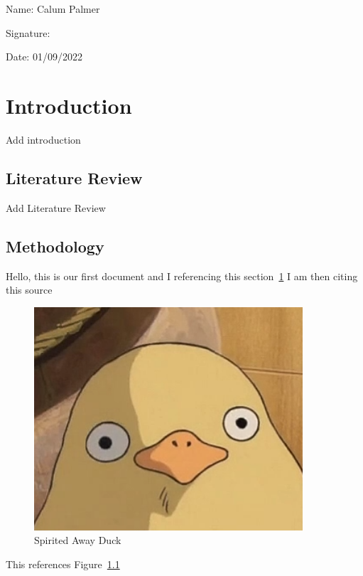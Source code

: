 \documentclass[12pt,a4 paper]{report}
\begin{document}
    \vspace{2cm}
        {\noindent\large Name: Calum Palmer}

    \vspace{0.5cm}
        {\noindent\large Signature: }

    \vspace{0.5cm}
        {\noindent\large Date: 01/09/2022}

    \newpage

    \tableofcontents
    \listoffigures
    \listoftables
    \newpage


    \chapter{Introduction}\label{ch:introduction}

    Add introduction


    \section{Literature Review}\label{sec:literature review}

    Add Literature Review

    \section{Methodology}\label{sec:methodology}

    Hello, this is our first document and I referencing this section~\ref{ch:introduction}
    I am then citing this source~\cite{ani2019victory}

    \begin{figure}
        \centering
        \includegraphics[width=10cm]{figures/SpiritedAwayDuck3}
        \caption{Spirited Away Duck}
        \label{fig:SpiritedAwayDuck}
    \end{figure}


    This references Figure~\ref{fig:SpiritedAwayDuck}

    
    
\end{document}
